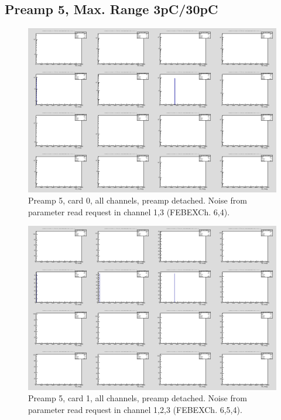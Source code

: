 \documentclass{report}
\begin{document}
\newpage
\clearpage


\subsection{Preamp 5, Max. Range 3pC/30pC}
\begin{figure}[!htb]
  \includegraphics[width=\linewidth]{rc_bus_test/preamp5_card0_gamma_all.png}
  \caption{Preamp 5, card 0, all channels, preamp detached. Noise from parameter read request in channel 1,3 (FEBEXCh. 6,4).}
\end{figure}
\begin{figure}[!htb]
  \includegraphics[width=\linewidth]{rc_bus_test/preamp5_card1_gamma_all.png}
  \caption{Preamp 5, card 1, all channels, preamp detached. Noise from parameter read request in channel 1,2,3 (FEBEXCh. 6,5,4).}
\end{figure}
\end{document}

